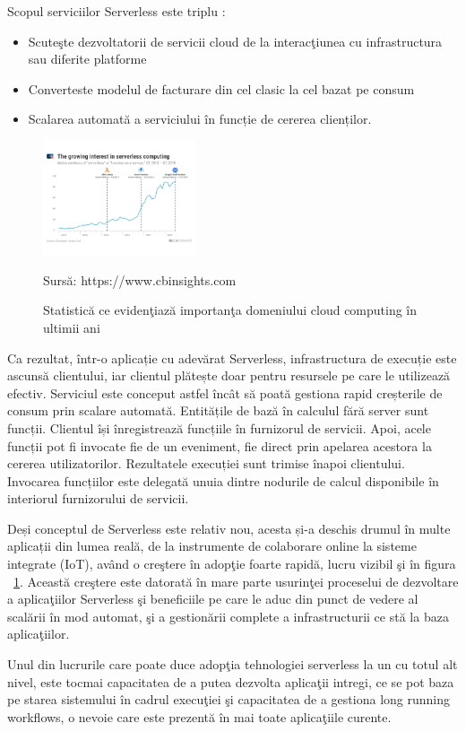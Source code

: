 \documentclass[a4paper,12pt]{report}
\newcommand{\source}[1]{\caption*{Sursă: {#1}} }
\begin{document}
Scopul serviciilor Serverless este triplu : 
\begin{itemize}
\item Scuteşte dezvoltatorii de servicii cloud de la interacţiunea cu infrastructura sau diferite platforme
\item Converteste modelul de facturare din cel clasic la cel bazat pe consum
\item Scalarea automată a serviciului în funcție de cererea clienților.
\end{itemize}
\par

\begin{figure}
	  \begin{center}
        \includegraphics[width=0.4\textwidth]{images/grafic_serverless_computing}
       \caption{Statistică ce evidenţiază importanţa domeniului cloud computing în ultimii ani}
			\label{fig:cloud_computing_graph}
       \source {https://www.cbinsights.com}
    \end{center}
\end{figure}
Ca rezultat, într-o aplicație cu adevărat Serverless, infrastructura de execuție este ascunsă clientului, iar clientul plătește doar pentru resursele pe care le utilizează efectiv. Serviciul este conceput astfel încât să poată gestiona rapid creșterile de consum prin scalare automată. Entitățile de bază în calculul fără server sunt funcții. Clientul își înregistrează funcțiile în furnizorul de servicii. Apoi, acele funcții pot fi invocate fie de un eveniment, fie direct prin apelarea acestora la cererea utilizatorilor. Rezultatele execuției sunt trimise înapoi clientului. Invocarea funcțiilor este delegată unuia dintre nodurile de calcul disponibile în interiorul furnizorului de servicii.

\par
Deși conceptul de Serverless este relativ nou, acesta și-a deschis drumul în multe aplicații din lumea reală, de la instrumente de colaborare online la sisteme integrate (IoT), având o creştere în adopţie foarte rapidă, lucru vizibil şi în figura ~\ref{fig:cloud_computing_graph}. Această creştere este datorată în mare parte usurinţei proceselui de dezvoltare a aplicaţiilor Serverless şi beneficiile pe care le aduc din punct de vedere al scalării în mod automat, şi a gestionării complete a infrastructurii ce stă la baza aplicaţiilor. 
\par
Unul din lucrurile care poate duce adopţia tehnologiei serverless la un cu totul alt nivel, este tocmai capacitatea de a putea dezvolta aplicaţii intregi, ce se pot baza pe starea sistemului în cadrul execuţiei şi capacitatea de a gestiona long running workflows, o nevoie care este prezentă în mai toate aplicaţiile curente. 
\end{document}
